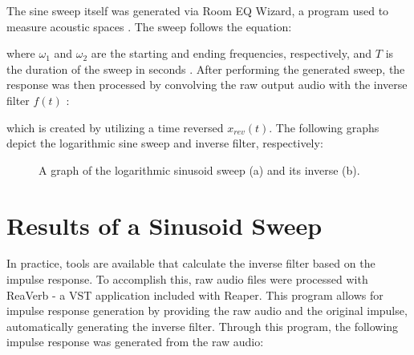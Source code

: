 The sine sweep itself was generated via Room EQ Wizard, a program used to measure acoustic spaces \cite{REW}. The sweep follows the equation:

\begin{center}
\end{center}

where $\omega_1$ and $\omega_2$ are the starting and ending frequencies, respectively, and $T$ is the duration of the sweep in seconds \cite{farina2000simultaneous}. After performing the generated sweep, the response was then processed by convolving the raw output audio with the inverse filter $f(t)$ \cite{inversecalc}:

\begin{center}
\end{center}

which is created by utilizing a time reversed $x_{rev}(t)$. The following graphs depict the logarithmic sine sweep and inverse filter, respectively:


\begin{figure}[h]
\caption{A graph of the logarithmic sinusoid sweep (a) and its inverse (b).}
\end{figure}

\section{Results of a Sinusoid Sweep}

In practice, tools are available that calculate the inverse filter based on the impulse response. To accomplish this, raw audio files were processed with ReaVerb - a VST application included with Reaper. This program allows for impulse response generation by providing the raw audio and the original impulse, automatically generating the inverse filter. Through this program, the following impulse response was generated from the raw audio:


